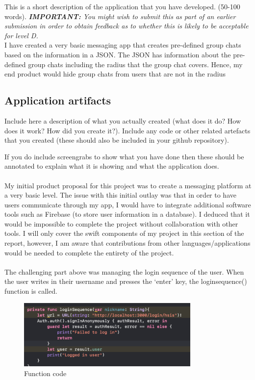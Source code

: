 \documentclass[a4paper, 11pt]{report}
\begin{document}
This is a short description of the application that you have developed. (50-100 words).
\textit{{\bf IMPORTANT:} You might wish to submit this as part of an earlier submission in order to obtain feedback as to whether this is likely to be acceptable for level D.}
\\
I have created a very basic messaging app that creates pre-defined group chats based on the information in a JSON. The JSON has information about the pre-defined group chats including the radius that the group chat covers. Hence, my end product would hide group chats from users that are not in the radius

\subsection{Application artifacts}

Include here a description of what you actually created (what does it do? How does it work? How did you create it?). Include any code or other related artefacts that you created (these should also be included in your github repository).

If you do include screengrabs to show what you have done then these should be annotated to explain what it is showing and what the application does.\\
\\
My initial product proposal for this project was to create a messaging platform at a very basic level. The issue with this initial outlay was that in order to have users communicate through my app, I would have to integrate additional software tools such as Firebase (to store user information in a database). I deduced that it would be impossible to complete the project without collaboration with other tools. I will only cover the swift components of my project in this section of the report, however, I am aware that contributions from other languages/applications would be needed to complete the entirety of the project.\\
\\

\newpage
The challenging part above was managing the login sequence of the user. When the user writes in their username and presses the ‘enter’ key, the loginsequence() function is called.
\\
\begin{figure}[ht]
 \centering
 \includegraphics[width=0.8\textwidth]{3.png}
 \caption{Function code}
 \label{fig:example}
\end{figure}
\end{document}

